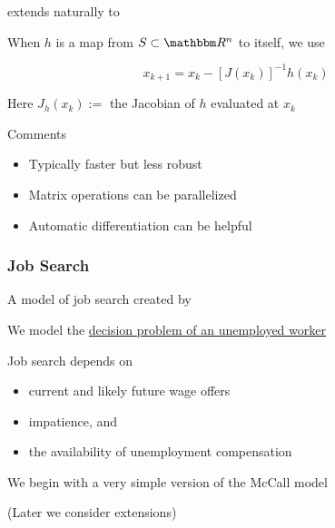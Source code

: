 \begin{frame}
    
     extends naturally to 

            \vspace{0.5em}
    When $h$ is a map from $S \subset \RR^n$ to itself, we use

    \begin{equation*}
        x_{k+1} = x_k - [J(x_k)]^{-1} h(x_k)
    \end{equation*}

    Here $J_h(x_k) := $ the Jacobian of $h$ evaluated at $x_k$

    \vspace{1em}

    Comments
    \begin{itemize}
        \item Typically faster but less robust
            \vspace{0.5em}
        \item Matrix operations can be parallelized
            \vspace{0.5em}
        \item Automatic differentiation can be helpful
    \end{itemize}



\end{frame}




\begin{frame}
    \frametitle{Job Search}

    A model of job search created by 
    \vspace{0.5em}

    We model the \underline{decision problem of an unemployed worker}

    \vspace{0.5em}
    Job search depends on
    \begin{itemize}
        \item current and likely future wage offers
    \vspace{0.5em}
        \item impatience, and
    \vspace{0.5em}
        \item the availability of unemployment compensation
    \end{itemize}

    \vspace{0.5em}
    We begin with a very simple version of the McCall model 

    \vspace{0.5em}
    (Later we consider extensions)

\end{frame}


